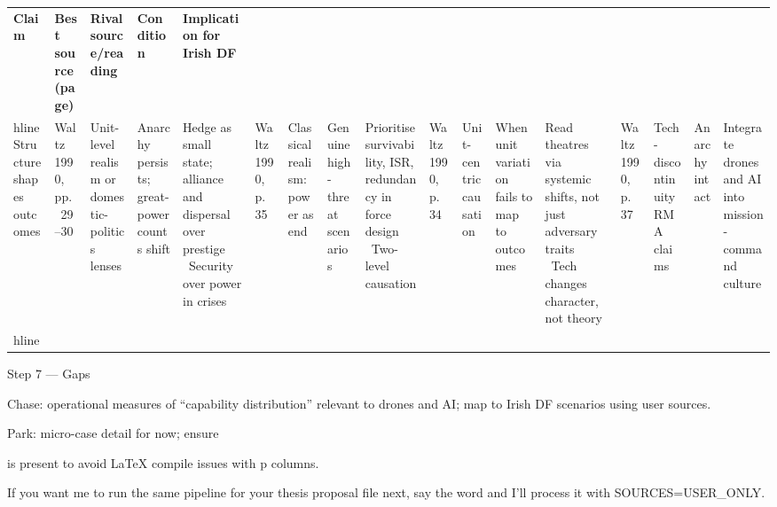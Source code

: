 \usepackage{array}
\begin{tabular}{p{3.2cm}p{4.2cm}p{3.6cm}p{3.2cm}p{4.2cm}}
	\textbf{Claim} & \textbf{Best source (page)} & \textbf{Rival source/reading} & \textbf{Condition} & \textbf{Implication for Irish DF}\\hline
	Structure shapes outcomes & Waltz 1990, pp.~29–30 & Unit-level realism or domestic-politics lenses & Anarchy persists; great-power counts shift & Hedge as small state; alliance and dispersal over prestige \
	Security over power in crises & Waltz 1990, p.~35 & Classical realism: power as end & Genuine high-threat scenarios & Prioritise survivability, ISR, redundancy in force design \
	Two-level causation & Waltz 1990, p.~34 & Unit-centric causation & When unit variation fails to map to outcomes & Read theatres via systemic shifts, not just adversary traits \
	Tech changes character, not theory & Waltz 1990, p.~37 & Tech-discontinuity RMA claims & Anarchy intact & Integrate drones and AI into mission-command culture \\hline
\end{tabular}

Step 7 — Gaps

Chase: operational measures of “capability distribution” relevant to drones and AI; map to Irish DF scenarios using user sources.

Park: micro-case detail for now; ensure \usepackage{array} is present to avoid LaTeX compile issues with p{} columns.

If you want me to run the same pipeline for your thesis proposal file next, say the word and I’ll process it with SOURCES=USER_ONLY.

